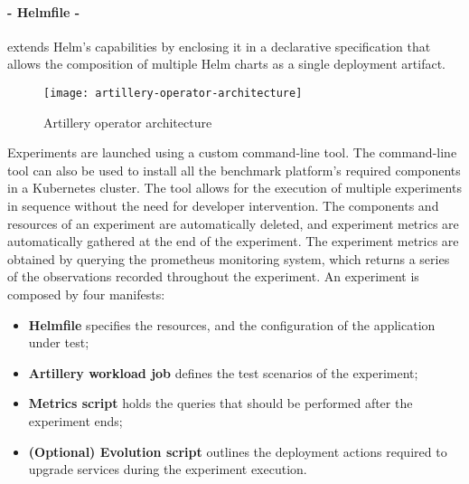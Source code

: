 \paragraph{- Helmfile \cite{helmfile} -}
 extends Helm's capabilities by enclosing it in a declarative specification that allows the composition of multiple Helm charts as a single deployment artifact.

\begin{figure}[htbp]
    \centering
    \centerline{\texttt{[image: artillery-operator-architecture]}}
    \caption{Artillery operator architecture}
    \label{fig:artilleryoperator}
\end{figure}

Experiments are launched using a custom command-line tool.
The command-line tool can also be used to install all the benchmark platform's required components in a Kubernetes cluster.
The tool allows for the execution of multiple experiments in sequence without the need for developer intervention.
The components and resources of an experiment are automatically deleted, and experiment metrics are automatically gathered at the end of the experiment.
The experiment metrics are obtained by querying the prometheus monitoring system, which returns a series of the observations recorded throughout the experiment.
An experiment is composed by four manifests:
\begin{itemize}
    \setlength\itemsep{0em}
    \item \textbf{Helmfile} specifies the resources, and the configuration of the application under test;
    \item \textbf{Artillery workload job} defines the test scenarios of the experiment;
    \item \textbf{Metrics script} holds the queries that should be performed after the experiment ends;
    \item \textbf{(Optional) Evolution script} outlines the deployment actions required to upgrade services during the experiment execution.
\end{itemize}

